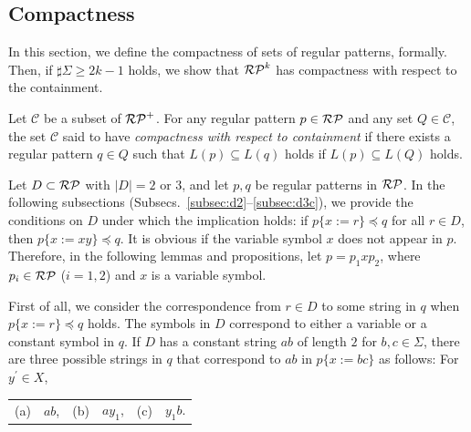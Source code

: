 \subsection{Compactness}\label{subsec:compactness}

In this section, we define the compactness of sets of regular patterns, formally.
Then, if $\sharp\Sigma \ge 2k-1$ holds, 
we show that 
$\mathcal{RP}^{k}$ has compactness with respect to the containment.

\begin{dfn}\label{def:compactness}
Let $\mathcal{C}$ be a subset of $\mathcal{RP}^{+}$. 
For any regular pattern $p \in \mathcal{RP}$ and any set $Q \in \mathcal{C}$,
the set $\mathcal{C}$ said to have {\it compactness with respect to containment}
if there exists a regular pattern $q \in Q$ such that $L(p) \subseteq L(q)$ holds if $L(p) \subseteq L(Q)$ holds.
\end{dfn}

Let $D \subset \mathcal{RP}$ with $|D| = 2$ or $3$, and let $p,q$ be regular patterns in $\mathcal{RP}$.
In the following subsections (Subsecs.~\ref{subsec:d2}--\ref{subsec:d3c}), we provide the conditions on $D$ under which the implication holds: if $p \{ x := r \} \preceq q$ for all $r \in D$, then $p \{ x := xy \} \preceq q$.
It is obvious if the variable symbol $x$ does not appear in $p$.
Therefore, in the following lemmas and propositions, let $p=p_{1}xp_{2}$, where $p_{i}\in \mathcal{RP}$ ($i=1,2$) and $x$ is a variable symbol.

First of all, we consider the correspondence from $r\in D$ to some string in $q$ when $p \{ x := r \} \preceq q$ holds.
The symbols in $D$ correspond to either a variable or a constant symbol in $q$.
If $D$ has a constant string $ab$ of length $2$ for $b,c\in\Sigma$, there are three possible strings in $q$ that correspond to $ab$ in $p\{x:=bc\}$ as follows: For $y^{\prime} \in X$,
  \begin{center}
    \begin{tabular}{cccccc}
      \textrm{(a)} & $ab$, & \textrm{(b)} & $ay_{1}$, & \textrm{(c)} & $y_{1}b$.
    \end{tabular}
  \end{center}

